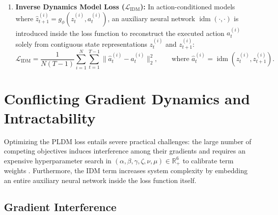 \documentclass[11pt, oneside, openany]{book}
\DeclareMathOperator{\idm}{idm}
\begin{document}
\begin{enumerate}
\begin{equation}
    \label{eq:6.5}
    \mathcal{L}_{\text{time-sim}} = \frac{1}{N(T - 1)} \sum_{i=1}^{N} \sum_{t=1}^{T-1} \lVert z_{t}^{(i)} - z_{t+1}^{(i)} \rVert_{2}^{2}.
    \end{equation}
    \item \textbf{Inverse Dynamics Model Loss ($\mathcal{L}_{\text{IDM}}$):} In action-conditioned models where $\hat{z}_{t+1}^{(i)} = g_{\phi}(z_{t}^{(i)}, a_{t}^{(i)})$, an auxiliary neural network $\idm(\cdot, \cdot)$ is introduced inside the loss function to reconstruct the executed action $a_{t}^{(i)}$ solely from contiguous state representations $z_{t}^{(i)}$ and $z_{t+1}^{(i)}$:
    \begin{equation}
    \label{eq:6.6}
    \mathcal{L}_{\text{IDM}} = \frac{1}{N(T - 1)} \sum_{i=1}^{N} \sum_{t=1}^{T-1} \lVert \hat{a}_{t}^{(i)} - a_{t}^{(i)} \rVert_{2}^{2}, \qquad \text{where } \hat{a}_{t}^{(i)} = \idm\left(z_{t}^{(i)}, z_{t+1}^{(i)}\right).
    \end{equation}
\end{enumerate}

\section{Conflicting Gradient Dynamics and Intractability}
\label{sec:6.3}

Optimizing the PLDM loss entails severe practical challenges: the large number of competing objectives induces interference among their gradients \cite{yu2020gradient} and requires an expensive hyperparameter search in $(\alpha, \beta, \gamma, \zeta, \nu, \mu) \in \mathbb{R}_{+}^{6}$ to calibrate term weights \cite{sobal2025learning}. Furthermore, the IDM term increases system complexity by embedding an entire auxiliary neural network inside the loss function itself.

\subsection*{Gradient Interference}
\end{document}
